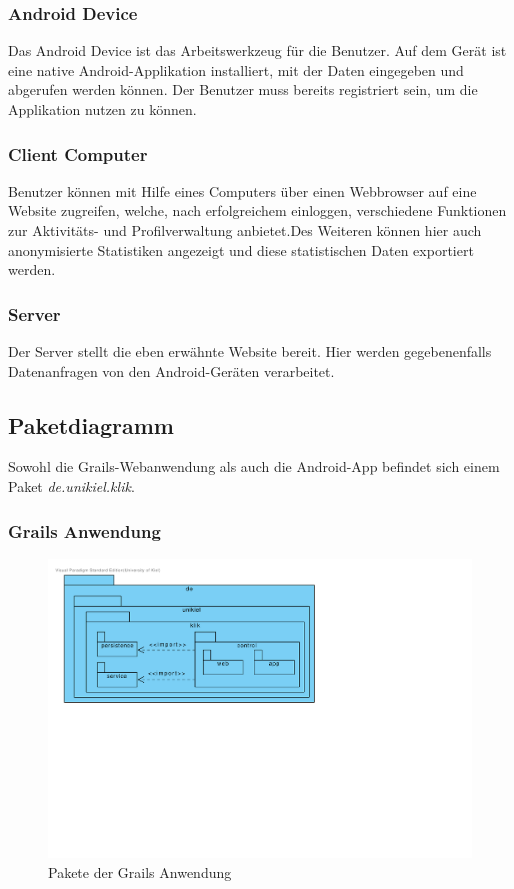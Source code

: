 \subsubsection{Android Device}
Das Android Device ist das Arbeitswerkzeug für die Benutzer. Auf dem
Gerät ist eine native Android-Applikation installiert, mit der Daten
eingegeben und abgerufen werden können. Der Benutzer muss bereits
registriert sein, um die Applikation nutzen zu können.

\subsubsection{Client Computer}
Benutzer können mit Hilfe eines Computers über einen Webbrowser auf eine Website zugreifen, welche, nach erfolgreichem einloggen, verschiedene Funktionen zur Aktivitäts- und Profilverwaltung anbietet.Des Weiteren können hier auch anonymisierte Statistiken angezeigt und diese statistischen Daten exportiert werden.

\subsubsection{Server}
Der Server stellt die eben erwähnte Website bereit. Hier werden gegebenenfalls Datenanfragen von den Android-Geräten verarbeitet.

\subsection{Paketdiagramm}
Sowohl die Grails-Webanwendung als auch die Android-App befindet sich einem Paket \emph{de.unikiel.klik}.

\subsubsection{Grails Anwendung}

\begin{figure}[H]
  \centering
  \includegraphics[width=\textwidth, trim=1cm 10cm 11cm 1cm, clip]{gfx/package_diagram}
  \caption{Pakete der Grails Anwendung}
\end{figure}

